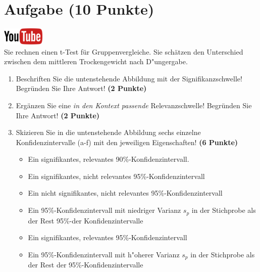 \documentclass[a4paper, 10pt]{scrartcl}\usepackage[]{graphicx}\usepackage[]{xcolor}
\begin{document}
 
\clearpage

\section{Aufgabe \hfill (10 Punkte)}

\hfill\href{https://youtu.be/CN_O4fYPbhs}{\includegraphics[width =
  2cm]{img/youtube}}\\[1Ex]



Sie rechnen einen t-Test f{\"u}r Gruppenvergleiche. Sie sch{\"a}tzen den Unterschied
zwischen dem mittleren Trockengewicht nach D{"u}ngergabe. 

\begin{enumerate}
\item Beschriften Sie die untenstehende Abbildung mit der
  Signifikanzschwelle! Begr{\"u}nden Sie Ihre Antwort! \textbf{(2 Punkte)}
\item Erg{\"a}nzen Sie eine \textit{in den Kontext passende} Relevanzschwelle!
  Begr{\"u}nden Sie Ihre Antwort! \textbf{(2 Punkte)} 
\item Skizieren Sie in die
  untenstehende Abbildung sechs einzelne Konfidenzintervalle (a-f) mit den
  jeweiligen Eigenschaften! \textbf{(6 Punkte)}
  \begin{itemize}
  \item[(a)] Ein signifikantes, relevantes 90\%-Konfidenzintervall. 	
  \item[(b)] Ein signifikantes, nicht relevantes 95\%-Konfidenzintervall 	
  \item[(c)] Ein nicht signifikantes, nicht relevantes 95\%-Konfidenzintervall 	
  \item[(d)] Ein 95\%-Konfidenzintervall mit niedriger Varianz $s_p$ in der Stichprobe als der Rest 95\%-der Konfidenzintervalle 
  \item[(e)] Ein signifikantes, relevantes 95\%-Konfidenzintervall
  \item[(f)] Ein 95\%-Konfidenzintervall mit h{"o}herer Varianz $s_p$ in der Stichprobe als der Rest der 95\%-Konfidenzintervalle
  \end{itemize}
\end{enumerate}
\end{document}
